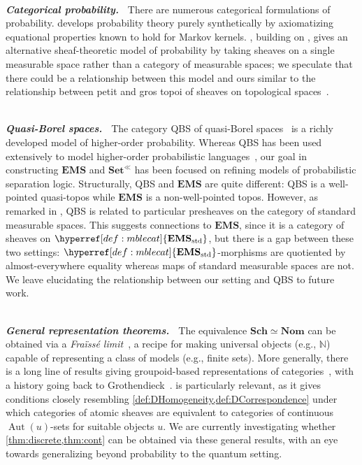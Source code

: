 \documentclass[
  sigconf,
  screen, ]{acmart}
\theoremstyle{definition}
\newcommand\Aut{\operatorname{Aut}}
\newcommand\N{\mathbb N}
\newcommand\goodparagraph[1]{\hspace{0em}\\[-0.5em]\textbf{\textit{#1.~}}}
\newcommand\nref[2]{\hyperref[#1]{#2}} \newcommand\checkhigh{{\huge{\color{red}\textbf{TODO: check}}}}
\newcommand\agoodnamecat{\mathbf{Set}^\ll}
\newcommand\goodsheafcat{\mathbf{EMS}}
\newcommand\texStdMble{\mathbf{EMS}_{\rm std}}
\newcommand\StdMble{{\nref{def:mblecat}{\texStdMble}}}
\newcommand\Sch{{\nref{def:Sch}{\mathbf{Sch}}}}
\newcommand\Nom{{\nref{def:Nom}{\mathbf{Nom}}}}
\newcommand\sheafcat{{\nref{def:sheafcat}{\goodsheafcat}}}
\newcommand\cgsets{{\nref{def:cgsets}{\agoodnamecat}}}
\begin{document}
\goodparagraph{Categorical probability}
There are numerous categorical formulations of probability.
\citet{fritz2020synthetic} develops probability theory purely synthetically by
axiomatizing equational properties known to hold for Markov kernels. 
\citet{jackson2006sheaf}, building on \citet{breitsprecher2006concept}, 
gives an alternative sheaf-theoretic model of
probability by taking sheaves on a single measurable space rather than a
category of measurable spaces; we speculate that there could be a relationship
between this model and ours similar to the relationship between 
petit and gros topoi of sheaves on topological spaces~\citep{maclane2012sheaves}.

\goodparagraph{Quasi-Borel spaces}
The category QBS of quasi-Borel spaces~\citep{heunen2017convenient}
is a richly developed model of higher-order probability.
Whereas QBS has been used extensively to
model higher-order probabilistic
languages~\citep{vakar2019domain,scibior2017denotational,aguirre2021higher,sato2019formal},
our goal in constructing $\sheafcat$ and $\cgsets$ has been focused on 
refining models of probabilistic
separation logic.
Structurally, QBS and $\sheafcat$ are quite different:
QBS is a well-pointed quasi-topos while $\sheafcat$ is a non-well-pointed topos. However,
as remarked in \citet[Prop. 34]{heunen2017convenient}, 
QBS is related to particular presheaves
on the category of standard measurable spaces.
This suggests connections to
$\sheafcat$, since it is a category of sheaves on $\StdMble$,
but there is a gap between these two settings:
$\StdMble$-morphisms are quotiented by
almost-everywhere equality whereas maps of standard measurable spaces are not.
We leave elucidating the relationship
between our setting and QBS to future work.

\goodparagraph{General representation theorems}
The equivalence $\Sch\simeq\Nom$ 
can be obtained via
a \emph{Fra{\"i}ss{\'e} limit}~\cite[\S 7.1]{hodges1993model},
a recipe for making universal objects (e.g., $\N$)
capable of representing a class of models (e.g., finite sets).
More generally, there is a long line of results giving
groupoid-based representations of
categories~\cite{butz1996representing,blass1989freyd,dubuc2003localic,joyal1984extension,blass1983Boolean,makkai1982full},
with a history going back to Grothendieck~\cite{grothendieck2002rev,dubuc2000galois}.
\citet{caramello2016topological} is particularly relevant, as it
gives conditions closely resembling \cref{def:DHomogeneity,def:DCorrespondence}
under which categories of atomic sheaves
are equivalent to categories of continuous $\Aut(u)$-sets for suitable objects $u$.
We are currently investigating whether \cref{thm:discrete,thm:cont}
can be obtained via these general results,
with an eye towards generalizing beyond probability
to the quantum setting.
\end{document}
